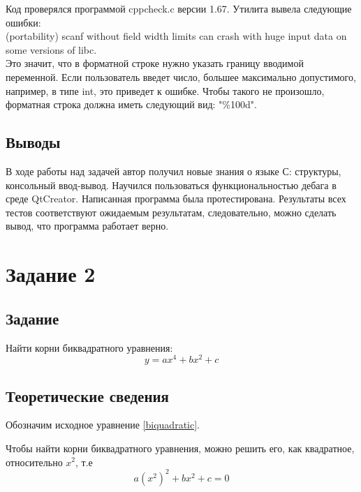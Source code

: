 \documentclass[12pt,a4paper]{report}
\begin{document}
Код проверялся программой cppcheck.c версии 1.67. Утилита вывела следующие ошибки: \\
(portability) scanf without field width limits can crash with huge input data on some versions of libc.\\
Это значит, что в форматной строке нужно указать границу вводимой переменной. Если пользователь введет число, большее максимально допустимого, например, в типе int, это приведет к ошибке. Чтобы такого не произошло, форматная строка должна иметь следующий вид: "\%100d".
\subsection{Выводы}
В ходе работы над задачей автор получил новые знания о языке С: структуры, консольный ввод-вывод. Научился пользоваться функциональностью дебага в среде QtCreator. Написанная программа была протестирована. Результаты всех тестов соответствуют ожидаемым результатам, следовательно, можно сделать вывод, что программа работает верно. 

\section{Задание 2}
\subsection{Задание}
Найти корни биквадратного уравнения: 
\begin{equation}
\label{biquadratic}
y = ax^{4} + bx^{2} + c
\end{equation}
\subsection{Теоретические сведения}
Обозначим исходное уравнение \ref{biquadratic}.

Чтобы найти корни биквадратного уравнения, можно решить его, как квадратное, относительно $x^{2}$, т.е
\begin{equation}
\label{quadratic}
  a(x^{2})^{2} + bx^{2} + c = 0
\end{equation}
\end{document}
